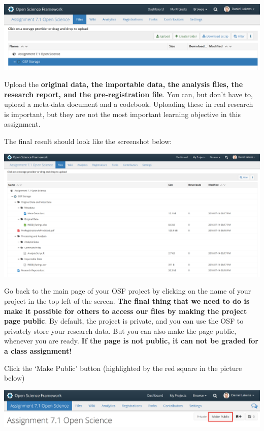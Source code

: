 \documentclass[
  oneside]{book}
\begin{document}
\begin{center}\includegraphics[width=1\linewidth]{images/380c79d73f62591732aafcd0a045ea2b} \end{center}

Upload the \textbf{original data, the importable data, the analysis files, the research report, and the pre-registration file}. You can, but don't have to, upload a meta-data document and a codebook. Uploading these in real research is important, but they are not the most important learning objective in this assignment.

The final result should look like the screenshot below:

\begin{center}\includegraphics[width=1\linewidth]{images/dec08b890995634acf624123962ed970} \end{center}

Go back to the main page of your OSF project by clicking on the name of your project in the top left of the screen. \textbf{The final thing that we need to do is make it possible for others to access our files by making the project page public}. By default, the project is private, and you can use the OSF to privately store your research data. But you can also make the page public, whenever you are ready. \textbf{If the page is not public, it can not be graded for a class assignment!}

Click the `Make Public' button (highlighted by the red square in the picture below)

\begin{center}\includegraphics[width=1\linewidth]{images/791bc1160787ae06a961761fb260b687} \end{center}
\end{document}
